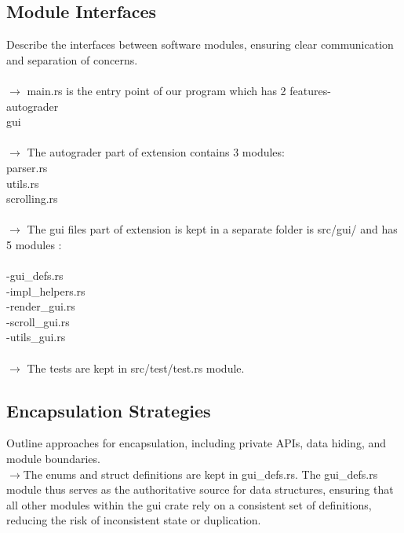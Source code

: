 \documentclass{article}
\begin{document}
\subsection{Module Interfaces}
\label{sec:interfaces}
Describe the interfaces between software modules, ensuring clear communication and separation of concerns.
\\ \\
$\rightarrow$ main.rs is the entry point of our program which has 2 features- \\
\hspace*{5mm}     autograder \\
\hspace*{5mm}    gui\\ \\
$\rightarrow$ The autograder part of extension contains 3 modules:\\
\hspace*{5mm}    parser.rs\\
\hspace*{5mm}     utils.rs\\
\hspace*{5mm}     scrolling.rs\\ \\
$\rightarrow$ The gui files part of extension is kept in a separate folder is src/gui/ and has 5 modules :\\ \\
\hspace*{5mm}     -gui\_defs.rs \\
\hspace*{5mm}     -impl\_helpers.rs \\
\hspace*{5mm}     -render\_gui.rs \\
\hspace*{5mm}     -scroll\_gui.rs \\
\hspace*{5mm}     -utils\_gui.rs \\ \\
$\rightarrow$ The tests are kept in src/test/test.rs module.
\\

\subsection{Encapsulation Strategies}
\label{sec:encapsulation}
Outline approaches for encapsulation, including private APIs, data hiding, and module boundaries.
\\
\hspace*{5mm}     $\rightarrow$The enums and struct definitions are kept in gui\_defs.rs. The gui\_defs.rs module thus serves as the authoritative source for data structures, ensuring that all other modules within the gui crate rely on a consistent set of definitions, reducing the risk of inconsistent state or duplication.
\end{document}
